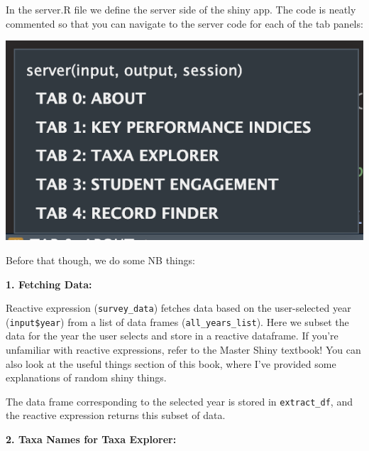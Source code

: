 \documentclass[
]{book}
\newenvironment{Shaded}{\begin{snugshade}}{\end{snugshade}}
\newcommand{\FunctionTok}[1]{\textcolor[rgb]{0.13,0.29,0.53}{\textbf{#1}}}
\newcommand{\NormalTok}[1]{#1}
\newcommand{\OtherTok}[1]{\textcolor[rgb]{0.56,0.35,0.01}{#1}}
\newcommand{\SpecialCharTok}[1]{\textcolor[rgb]{0.81,0.36,0.00}{\textbf{#1}}}
\begin{document}
In the server.R file we define the server side of the shiny app. The code is neatly commented so that you can navigate to the server code for each of the tab panels:

\includegraphics{images/server.png}

Before that though, we do some NB things:

\textbf{1. Fetching Data:}

Reactive expression (\texttt{survey\_data}) fetches data based on the user-selected year (\texttt{input\$year}) from a list of data frames (\texttt{all\_years\_list}). Here we subset the data for the year the user selects and store in a reactive dataframe. If you're unfamiliar with reactive expressions, refer to the Master Shiny textbook! You can also look at the useful things section of this book, where I've provided some explanations of random shiny things.

The data frame corresponding to the selected year is stored in \texttt{extract\_df}, and the reactive expression returns this subset of data.

\begin{Shaded}
\end{Shaded}

\textbf{2. Taxa Names for Taxa Explorer:}

\begin{Shaded}
\end{Shaded}
\end{document}
